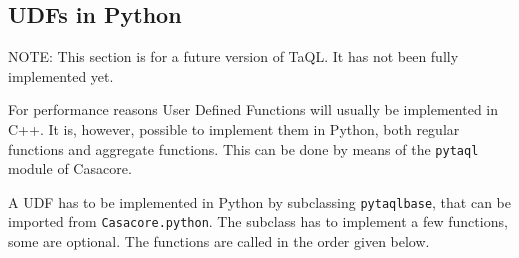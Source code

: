 \subsection{\label{TAQL:UDFPYTHON}UDFs in Python}
NOTE: This section is for a future version of TaQL. It has not been
fully implemented yet.

For performance reasons User Defined Functions will usually be
implemented in C++. It is, however, possible to implement them in
Python, both regular functions and aggregate functions. This can be
done by means of the \texttt{pytaql} module of Casacore.

A UDF has to be implemented in Python by subclassing
\texttt{pytaqlbase}, that can be imported from \texttt{Casacore.python}. 
The subclass has to implement a few functions, some are optional.
The functions are called in the order given below.

